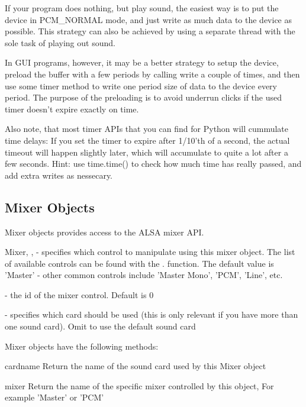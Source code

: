 If your program does nothing, but play sound, the easiest way is to
put the device in PCM_NORMAL mode, and just write as much data to the
device as possible. This strategy can also be achieved by using a
separate thread with the sole task of playing out sound.

In GUI programs, however, it may be a better strategy to setup the
device, preload the buffer with a few periods by calling write a
couple of times, and then use some timer method to write one period
size of data to the device every period. The purpose of the preloading
is to avoid underrun clicks if the used timer doesn't expire exactly
on time.

Also note, that most timer APIs that you can find for Python will
cummulate time delays: If you set the timer to expire after 1/10'th of
a second, the actual timeout will happen slightly later, which will
accumulate to quite a lot after a few seconds. Hint: use time.time()
to check how much time has really passed, and add extra writes as
nessecary.

\subsection{Mixer Objects}
\label{mixer-objects}

Mixer objects provides access to the ALSA mixer API.

\begin{classdesc}{Mixer}{, , 
    }
   - specifies which control to manipulate using this
  mixer object. The list of available controls can be found with the
  . function.  The default value is
  'Master' - other common controls include 'Master Mono', 'PCM',
  'Line', etc.

   - the id of the mixer control. Default is 0

   - specifies which card should be used (this is only
  relevant if you have more than one sound card). Omit to use the
  default sound card
\end{classdesc}

Mixer objects have the following methods:

\begin{methoddesc}[Mixer]{cardname}{}
  Return the name of the sound card used by this Mixer object
\end{methoddesc}

\begin{methoddesc}[Mixer]{mixer}{}
  Return the name of the specific mixer controlled by this object, For
  example 'Master' or 'PCM'
\end{methoddesc}

